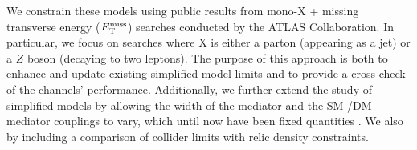 \begin{flushleft}
We constrain these models using public results from mono-X + missing transverse energy ($E_{\mathrm{T}}^{\mathrm{miss}}$) searches conducted by the ATLAS Collaboration. In particular, we focus on searches where X is either a parton (appearing as a jet) or a $Z$ boson (decaying to two leptons). The purpose of this approach is both to enhance and update existing simplified model limits \cite{} and to provide a cross-check of the channels' performance. Additionally, we further extend the study of simplified models by allowing the width of the mediator and the SM-/DM-mediator couplings to vary, which until now have been fixed quantities \cite{}. We also  by including a comparison of collider limits with relic density constraints.
\bigskip






\end{flushleft}
